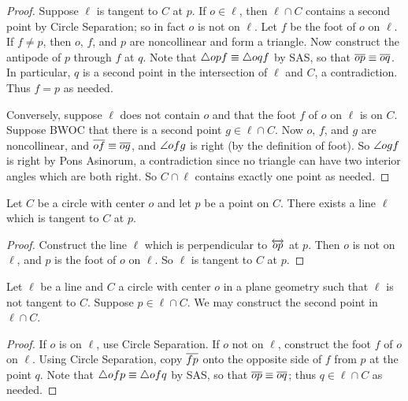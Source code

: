 \begin{proof}
Suppose \(\ell\) is tangent to \(C\) at \(p\).
If \(o \in \ell\), then \(\ell \cap C\) contains a second point by Circle Separation; so in fact \(o\) is not on \(\ell\).
Let \(f\) be the foot of \(o\) on \(\ell\).
If \(f \neq p\), then \(o\), \(f\), and \(p\) are noncollinear and form a triangle.
Now construct the antipode of \(p\) through \(f\) at \(q\).
Note that \(\bigtriangleup{opf} \equiv \bigtriangleup{oqf}\) by SAS, so that \(\overline{op} \equiv \overline{oq}\).
In particular, \(q\) is a second point in the intersection of \(\ell\) and \(C\), a contradiction.
Thus \(f = p\) as needed.

Conversely, suppose \(\ell\) does not contain \(o\) and that the foot \(f\) of \(o\) on \(\ell\) is on \(C\).
Suppose BWOC that there is a second point \(g \in \ell \cap C\).
Now \(o\), \(f\), and \(g\) are noncollinear, and \(\overline{of} \equiv \overline{og}\), and \(\angle{ofg}\) is right (by the definition of foot).
So \(\angle{ogf}\) is right by Pons Asinorum, a contradiction since no triangle can have two interior angles which are both right.
So \(C \cap \ell\) contains exactly one point as needed.
\end{proof}

\begin{construct}
Let \(C\) be a circle with center \(o\) and let \(p\) be a point on \(C\).
There exists a line \(\ell\) which is tangent to \(C\) at \(p\).
\end{construct}

\begin{proof}
Construct the line \(\ell\) which is perpendicular to \(\overleftrightarrow{op}\) at \(p\).
Then \(o\) is not on \(\ell\), and \(p\) is the foot of \(o\) on \(\ell\).
So \(\ell\) is tangent to \(C\) at \(p\).
\end{proof}

\begin{construct}
Let \(\ell\) be a line and \(C\) a circle with center \(o\) in a plane geometry such that \(\ell\) is not tangent to \(C\).
Suppose \(p \in \ell \cap C\).
We may construct the second point in \(\ell \cap C\).
\end{construct}

\begin{proof}
If \(o\) is on \(\ell\), use Circle Separation.
If \(o\) not on \(\ell\), construct the foot \(f\) of \(o\) on \(\ell\).
Using Circle Separation, copy \(\overline{fp}\) onto the opposite side of \(f\) from \(p\) at the point \(q\).
Note that \(\bigtriangleup{ofp} \equiv \bigtriangleup{ofq}\) by SAS, so that \(\overline{op} \equiv \overline{oq}\); thus \(q \in \ell \cap C\) as needed.
\end{proof}

